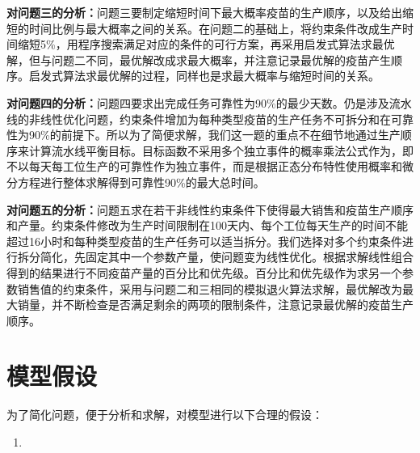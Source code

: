 \documentclass[UTF8]{ctexart}
\begin{document}
	\textbf{对问题三的分析：}问题三要制定缩短时间下最大概率疫苗的生产顺序，以及给出缩短的时间比例与最大概率之间的关系。在问题二的基础上，将约束条件改成生产时间缩短5\%，用程序搜索满足对应的条件的可行方案，再采用启发式算法求最优解，但与问题二不同，最优解改成求最大概率，并注意记录最优解的疫苗产生顺序。启发式算法求最优解的过程，同样也是求最大概率与缩短时间的关系。
	
	\textbf{对问题四的分析：}问题四要求出完成任务可靠性为90\%的最少天数。仍是涉及流水线的非线性优化问题，约束条件增加为每种类型疫苗的生产任务不可拆分和在可靠性为90\%的前提下。所以为了简便求解，我们这一题的重点不在细节地通过生产顺序来计算流水线平衡目标。目标函数不采用多个独立事件的概率乘法公式作为，即不以每天每工位生产的可靠性作为独立事件，而是根据正态分布特性使用概率和微分方程进行整体求解得到可靠性90\%的最大总时间。
	
	
	\textbf{对问题五的分析：}问题五求在若干非线性约束条件下使得最大销售和疫苗生产顺序和产量。约束条件修改为生产时间限制在100天内、每个工位每天生产的时间不能超过16小时和每种类型疫苗的生产任务可以适当拆分。我们选择对多个约束条件进行拆分简化，先固定其中一个参数产量，使问题变为线性优化。根据求解线性组合得到的结果进行不同疫苗产量的百分比和优先级。百分比和优先级作为求另一个参数销售值的约束条件，采用与问题二和三相同的模拟退火算法求解，最优解改为最大销量，并不断检查是否满足剩余的两项的限制条件，注意记录最优解的疫苗生产顺序。
	
	
	\section{模型假设}
	为了简化问题，便于分析和求解，对模型进行以下合理的假设：
	\begin{enumerate}
		\item
	\end{enumerate}
	
\end{document}
